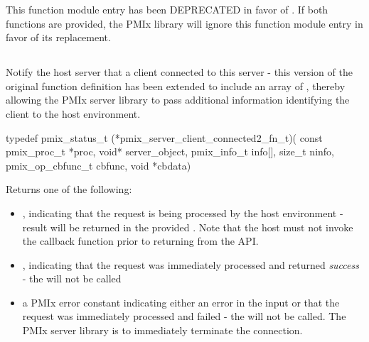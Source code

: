 \descr

This function module entry has been DEPRECATED in favor of . If both functions are provided, the \ac{PMIx} library will ignore this function module entry in favor of its replacement.

\subsection{}

\summary

Notify the host server that a client connected to this server - this version of the original function definition has been extended to include an array of , thereby allowing the \ac{PMIx} server library to pass additional information identifying the client to the host environment.

\format

\cspecificstart
\begin{codepar}
typedef pmix_status_t (*pmix_server_client_connected2_fn_t)(
                             const pmix_proc_t *proc,
                             void* server_object,
                             pmix_info_t info[], size_t ninfo,
                             pmix_op_cbfunc_t cbfunc,
                             void *cbdata)
\end{codepar}
\cspecificend

\begin{arglist}
\end{arglist}

Returns one of the following:

\begin{itemize}
    \item {}, indicating that the request is being processed by the host environment - result will be returned in the provided . Note that the host must not invoke the callback function prior to returning from the \ac{API}.
    \item {}, indicating that the request was immediately processed and returned \textit{success} - the  will not be called
    \item a PMIx error constant indicating either an error in the input or that the request was immediately processed and failed - the  will not be called. The \ac{PMIx} server library is to immediately terminate the connection.
\end{itemize}

